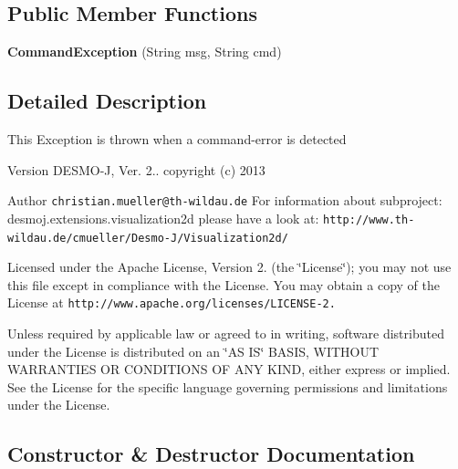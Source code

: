 \subsection*{Public Member Functions}
\begin{DoxyCompactItemize}
\item 
{\bf Command\-Exception} (String msg, String cmd)
\end{DoxyCompactItemize}


\subsection{Detailed Description}
This Exception is thrown when a command-\/error is detected

\begin{DoxyVersion}{Version}
D\-E\-S\-M\-O-\/\-J, Ver. 2.. copyright (c) 2013 
\end{DoxyVersion}
\begin{DoxyAuthor}{Author}
{\tt christian.\-mueller@th-\/wildau.\-de} For information about subproject\-: desmoj.\-extensions.\-visualization2d please have a look at\-: {\tt http\-://www.\-th-\/wildau.\-de/cmueller/\-Desmo-\/\-J/\-Visualization2d/}
\end{DoxyAuthor}
Licensed under the Apache License, Version 2. (the \char`\"{}\-License\char`\"{}); you may not use this file except in compliance with the License. You may obtain a copy of the License at {\tt http\-://www.\-apache.\-org/licenses/\-L\-I\-C\-E\-N\-S\-E-\/2.}

Unless required by applicable law or agreed to in writing, software distributed under the License is distributed on an \char`\"{}\-A\-S I\-S\char`\"{} B\-A\-S\-I\-S, W\-I\-T\-H\-O\-U\-T W\-A\-R\-R\-A\-N\-T\-I\-E\-S O\-R C\-O\-N\-D\-I\-T\-I\-O\-N\-S O\-F A\-N\-Y K\-I\-N\-D, either express or implied. See the License for the specific language governing permissions and limitations under the License. 

\subsection{Constructor \& Destructor Documentation}

